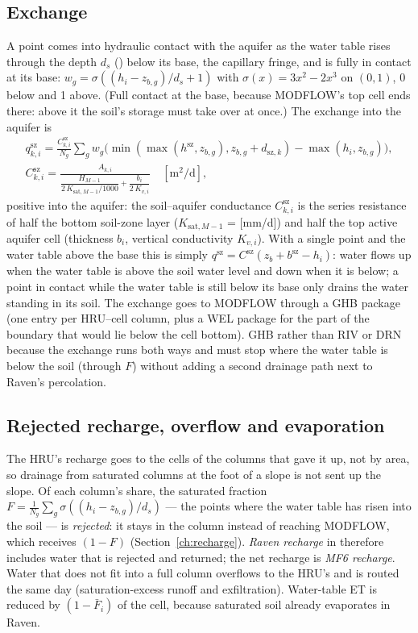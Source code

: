 \subsection{Exchange}
A point comes into hydraulic contact with the aquifer as the water table rises through the depth $d_s$
() below its base, the capillary fringe, and is fully in contact at its base:
$w_g=\sigma((h_i-z_{b,g})/d_s+1)$ with $\sigma(x)=3x^2-2x^3$ on $(0,1)$, 0 below and 1 above. (Full contact at the base,
because MODFLOW's top cell ends there: above it the soil's storage must take over at once.) The exchange into the
aquifer is
\begin{gather}
q^{\mathrm{sz}}_{k,i}=\frac{C^{\mathrm{sz}}_{k,i}}{N_g}\sum_gw_g\Big(\min(\max(h^{\mathrm{sz}},z_{b,g}),z_{b,g}+d_{\mathrm{sz},k})-\max(h_i,z_{b,g})\Big),\\
C^{\mathrm{sz}}_{k,i}=\frac{A_{k,i}}{\dfrac{H_{M-1}}{2\,K_{\mathrm{sat},M-1}/1000}+\dfrac{b_i}{2\,K_{v,i}}}\quad[\mathrm{m^2/d}],
\end{gather}
positive into the aquifer: the soil--aquifer conductance $C^{\mathrm{sz}}_{k,i}$ is the series resistance of half the bottom soil-zone layer
($K_{\mathrm{sat},M-1}$ =  [mm/d]) and half the top active aquifer cell (thickness $b_i$, vertical conductivity
$K_{v,i}$). With a single point and the water table above the base this is simply $q^{\mathrm{sz}}=C^{\mathrm{sz}}(z_b+b^{\mathrm{sz}}-h_i)$: water flows up
when the water table is above the soil water level and down when it is below; a point in contact while the water table
is still below its base only drains the water standing in its soil. The exchange goes to MODFLOW through a GHB package  (one entry per
HRU--cell column, plus a WEL package  for the part of the boundary that would lie below the cell bottom).
GHB rather than RIV or DRN because the exchange runs both ways and must stop where the water table is below the soil
(through $F$) without adding a second drainage path next to Raven's percolation.

\subsection{Rejected recharge, overflow and evaporation}
The HRU's recharge goes to the cells of the columns that gave it up, not by area, so drainage from saturated columns at
the foot of a slope is not sent up the slope. Of each column's share, the saturated fraction $F=\frac1{N_g}\sum_g\sigma((h_i-z_{b,g})/d_s)$ --- the points where the
water table has risen into the soil --- is \emph{rejected}: it stays in the column instead of reaching MODFLOW, which
receives $(1-F)$ (Section~\ref{ch:recharge}). \emph{Raven recharge} in  therefore includes water that is
rejected and returned; the net recharge is \emph{MF6 recharge}. Water that does not fit into a full
column overflows to the HRU's  and is routed the same day (saturation-excess runoff and
exfiltration). Water-table ET is reduced by $(1-\bar F_i)$ of the cell, because saturated soil already evaporates in
Raven.

